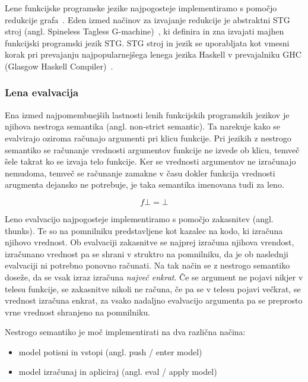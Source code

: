 Lene funkcijske programske jezike najpogosteje implementiramo s pomočjo redukcije gra\-fa~\cite{peyton1987implementation}. Eden izmed načinov za izvajanje redukcije je abstraktni STG stroj (angl. Spineless Tagless G-machine)~\cite{jones1992implementing}, ki definira in zna izvajati majhen funkcijski programski jezik STG. STG stroj in jezik se uporabljata kot vmesni korak pri prevajanju najpopularnejšega lenega jezika Haskell v prevajalniku GHC (Glasgow Haskell Compiler)~\cite{GHC}.


\subsubsection{Lena evalvacija}

Ena izmed najpomembnejših lastnosti lenih funkcijskih programskih jezikov je njihova nestroga semantika (angl. non-strict semantic). Ta narekuje kako se evalvirajo oziroma računajo argumenti pri klicu funkcije. Pri jezikih z nestrogo semantiko se računanje vrednosti argumentov funkcije ne izvede ob klicu, temveč šele takrat ko se izvaja telo funkcije. Ker se vrednosti argumentov ne izračunajo nemudoma, temveč se računanje zamakne v času dokler funkcija vrednosti arugmenta dejansko ne potrebuje, je taka semantika imenovana tudi za leno.

$$ f \bot = \bot $$

Leno evalvacijo najpogosteje implementiramo s pomočjo zakasnitev (angl. thunks). Te so na pomnilniku predstavljene kot kazalec na kodo, ki izračuna njihovo vrednost. Ob evalvaciji zakasnitve se najprej izračuna njihova vrendost, izračunano vrednost pa se shrani v struktro na pomnilniku, da je ob naslednji evalvaciji ni potrebno ponovno računati. Na tak način se z nestrogo semantiko doseže, da se vsak izraz izračuna \textit{največ enkrat}. Če se argument ne pojavi nikjer v telesu funkcije, se zakasnitve nikoli ne računa, če pa se v telesu pojavi večkrat, se vrednost izračuna enkrat, za vsako nadaljno evalvacijo argumenta pa se preprosto vrne vrednost shranjeno na pomnilniku.


Nestrogo semantiko je moč implementirati na dva različna načina:

\begin{itemize}
	\itemsep 0em
	\item model potisni in vstopi (angl. push / enter model)
	\item model izračunaj in apliciraj (angl. eval / apply model)
\end{itemize}

